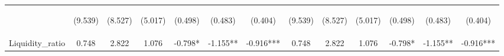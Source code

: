 \documentclass[]{article}
\begin{document}
\begin{center}
\begin{tabular}{lcccccccccccc}
\vspace{4pt} & \begin{footnotesize}(9.539)\end{footnotesize} & \begin{footnotesize}(8.527)\end{footnotesize} & \begin{footnotesize}(5.017)\end{footnotesize} & \begin{footnotesize}(0.498)\end{footnotesize} & \begin{footnotesize}(0.483)\end{footnotesize} & \begin{footnotesize}(0.404)\end{footnotesize} & \begin{footnotesize}(9.539)\end{footnotesize} & \begin{footnotesize}(8.527)\end{footnotesize} & \begin{footnotesize}(5.017)\end{footnotesize} & \begin{footnotesize}(0.498)\end{footnotesize} & \begin{footnotesize}(0.483)\end{footnotesize} & \begin{footnotesize}(0.404)\end{footnotesize} \\
Liquidity\_ratio & 0.748 & 2.822 & 1.076 & -0.798* & -1.155** & -0.916*** & 0.748 & 2.822 & 1.076 & -0.798* & -1.155** & -0.916*** \\

\end{tabular}
\end{center}
\end{document}
